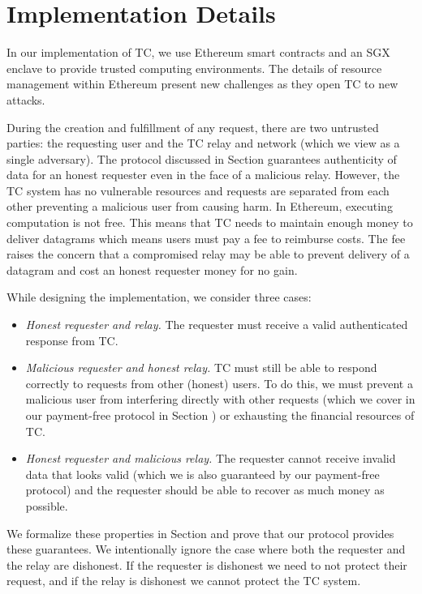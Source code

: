 
\section{\tc Implementation Details}
\label{sec:impl}

In our implementation of TC, we use Ethereum smart contracts and an SGX enclave to provide trusted computing environments.
The details of resource management within Ethereum present new challenges as they open TC to new attacks.

During the creation and fulfillment of any request, there are two untrusted parties:
the requesting user and the TC relay and network (which we view as a single adversary).
The protocol discussed in Section  guarantees authenticity of data for an honest requester even in the face of a malicious relay.
However, the TC system has no vulnerable resources and requests are separated from each other preventing a malicious user from causing harm.
In Ethereum, executing computation is not free.
This means that TC needs to maintain enough money to deliver datagrams which means users must pay a fee to reimburse costs.
The fee raises the concern that a compromised relay may be able to prevent delivery of a datagram and cost an honest requester money for no gain.

While designing the implementation, we consider three cases:
\begin{itemize}
  \item {\it Honest requester and relay.}
    The requester must receive a valid authenticated response from TC.

  \item {\it Malicious requester and honest relay.}
    TC must still be able to respond correctly to requests from other (honest) users.
    To do this, we must prevent a malicious user from interfering directly with other requests (which we cover in our payment-free protocol in Section )
    or exhausting the financial resources of TC.

  \item {\it Honest requester and malicious relay.}
    The requester cannot receive invalid data that looks valid (which we is also guaranteed by our payment-free protocol)
    and the requester should be able to recover as much money as possible.
\end{itemize}
We formalize these properties in Section  and prove that our protocol provides these guarantees.
We intentionally ignore the case where both the requester and the relay are dishonest.
If the requester is dishonest we need to not protect their request, and if the relay is dishonest we cannot protect the TC system.

